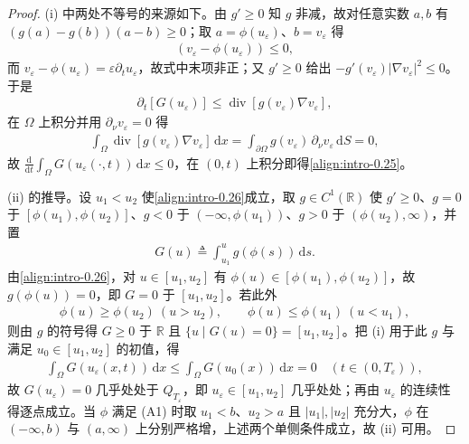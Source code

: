 \documentclass[../main.tex]{subfiles}
\begin{document}
\begin{proof}
(i) 中两处不等号的来源如下。由 $g'\geqslant0$ 知 $g$ 非减，故对任意实数 $a,b$ 有 $(g(a)-g(b))(a-b)\geqslant0$；取 $a=\phi(u_\varepsilon)$、$b=v_\varepsilon$ 得
\begin{align*}
[g(\phi(u_\varepsilon))-g(v_\varepsilon)](v_\varepsilon-\phi(u_\varepsilon))\leqslant0,
\end{align*}
而 $v_\varepsilon-\phi(u_\varepsilon)=\varepsilon\partial_t u_\varepsilon$，故式中末项非正；又 $g'\geqslant0$ 给出 $-g'(v_\varepsilon)|\nabla v_\varepsilon|^2\leqslant0$。于是
\begin{align*}
\partial_t[G(u_\varepsilon)]\leqslant\operatorname{div}[g(v_\varepsilon)\nabla v_\varepsilon],
\end{align*}
在 $\Omega$ 上积分并用 $\partial_\nu v_\varepsilon=0$ 得
\begin{align*}
\int_\Omega\operatorname{div}[g(v_\varepsilon)\nabla v_\varepsilon]\,\mathrm{d}x
=\int_{\partial\Omega}g(v_\varepsilon)\,\partial_\nu v_\varepsilon\,\mathrm{d}S=0,
\end{align*}
故 $\frac{\mathrm{d}}{\mathrm{d}t}\int_\Omega G(u_\varepsilon(\cdot,t))\,\mathrm{d}x\leqslant0$，在 $(0,t)$ 上积分即得\eqref{align:intro-0.25}。

(ii) 的推导。设 $u_1<u_2$ 使\eqref{align:intro-0.26}成立，取 $g\in C^1(\mathbb{R})$ 使 $g'\geqslant0$、$g=0$ 于 $[\phi(u_1),\phi(u_2)]$、$g<0$ 于 $(-\infty,\phi(u_1))$、$g>0$ 于 $(\phi(u_2),\infty)$，并置
\begin{align*}
G(u)\triangleq\int_{u_1}^{u}g(\phi(s))\,\mathrm{d}s .
\end{align*}
由\eqref{align:intro-0.26}，对 $u\in[u_1,u_2]$ 有 $\phi(u)\in[\phi(u_1),\phi(u_2)]$，故 $g(\phi(u))=0$，即 $G=0$ 于 $[u_1,u_2]$。若此外
\begin{align*}
\phi(u)\geqslant\phi(u_2)\ (u>u_2),
\qquad
\phi(u)\leqslant\phi(u_1)\ (u<u_1),
\end{align*}
则由 $g$ 的符号得 $G\geqslant0$ 于 $\mathbb{R}$ 且 $\{u\mid G(u)=0\}=[u_1,u_2]$。把 (i) 用于此 $g$ 与满足 $u_0\in[u_1,u_2]$ 的初值，得
\begin{align*}
\int_\Omega G(u_\varepsilon(x,t))\,\mathrm{d}x\leqslant\int_\Omega G(u_0(x))\,\mathrm{d}x=0
\quad (t\in(0,T_\varepsilon)),
\end{align*}
故 $G(u_\varepsilon)=0$ 几乎处处于 $Q_{T_\varepsilon}$，即 $u_\varepsilon\in[u_1,u_2]$ 几乎处处；再由 $u_\varepsilon$ 的连续性得逐点成立。当 $\phi$ 满足 (A1) 时取 $u_1<b$、$u_2>a$ 且 $|u_1|,|u_2|$ 充分大，$\phi$ 在 $(-\infty,b)$ 与 $(a,\infty)$ 上分别严格增，上述两个单侧条件成立，故 (ii) 可用。
\end{proof}
\end{document}

